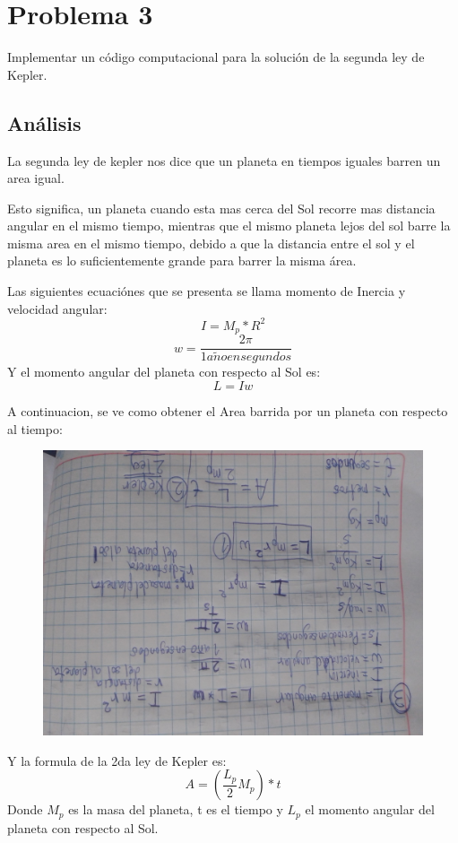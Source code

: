 \documentclass[a4paper,12pt]{article}
\newcommand{\eq}[1]{$#1$}
\begin{document}
    \section{Problema 3}
    Implementar un código computacional para la 
    solución de la segunda ley de Kepler.
    \subsection{Análisis}
    La segunda ley de kepler nos dice que un planeta
    en tiempos iguales barren un area igual.

    Esto significa, un planeta cuando esta mas cerca del Sol recorre mas distancia angular en el mismo tiempo,
    mientras que el mismo planeta lejos del sol barre la misma area en el mismo tiempo, debido a que
    la distancia entre el sol y el planeta es lo suficientemente grande para barrer la misma área.

    Las siguientes ecuaciónes que se presenta se llama 
    momento de Inercia y velocidad angular:
    \begin{equation}
        I = M_p*R^2
    \end{equation}
    \begin{equation}
        w = \frac{2\pi}{1 a\tilde{n}o en segundos}
    \end{equation}
    Y el momento angular del planeta con respecto al Sol es:
    \begin{equation}
        L = Iw
    \end{equation}

    A continuacion, se ve como obtener el Area barrida por 
    un planeta con respecto al tiempo:

    \begin{figure}[htbp]
        \centering
        \includegraphics[scale=0.2,angle=180]{ejer3fc}
    \end{figure}
    Y la formula de la 2da ley de Kepler es:
    \begin{equation}
        A = (\frac{L_p}{2}M_p)*t
    \end{equation}
    Donde \eq{M_p} es la masa del planeta, t es el tiempo y 
    \eq{L_p} el momento angular del planeta con respecto al Sol.
\end{document}
